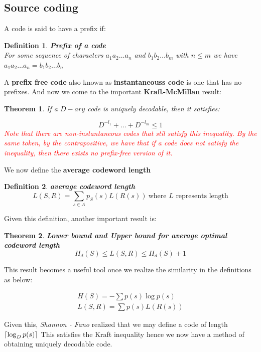 \documentclass[titlepage]{article}
\DeclarePairedDelimiter{\ceil}{\lceil}{\rceil}
\newtheorem{theorem}{Theorem}[section]
\newtheorem{definition}{Definition}
\begin{document}
\subsection{Source coding}
A code is said to have a prefix if:
\begin{definition}\textbf{Prefix of a code}
\\

For some sequence of characters $a_{1}a_{2}\ldots a_{n}$ and $b_{1}b_{2}\ldots b_{m}$ with $n \leq m$ we have $a_{1}a_{2}\ldots a_{n} =  b_{1}b_{2}\ldots b_{n}$
\end{definition}

A \textbf{prefix free code} also known as \textbf{instantaneouss code} is one that has no prefixes. And now we come to the important \textbf{Kraft-McMillan} result:

\begin{theorem}
If a $D-ary$ code is uniquely decodable, then it satisfies:

$$ D^{-l_{1}} + \ldots + D^{-l_{m}} \leq 1 $$
\textcolor{red}{Note that there are non-instantaneous codes that stil satisfy this inequality. By the same token, by the contrapositive, we have that if a code does not satisfy the inequality, then there exists no prefix-free version of it.}
\end{theorem}

We now define the \textbf{average codeword length}

\begin{definition}\textbf{average codeword length}
$$ L(S,R) = \sum_{s \in A} p_{S}(s)L(R(s)) \ \text{where $L$ represents length}$$
\end{definition}

Given this definition, another important result is:

\begin{theorem} \textbf{Lower bound and Upper bound for average optimal codeword length}
$$H_{d}(S) \leq L(S,R) \leq H_{d}(S) + 1$$
\end{theorem}

This result becomes a useful tool once we realize the similarity in the definitions as below:

\begin{align*}
    H(S) = - \sum p(s)\log p(s)\\
    L(S,R) = \sum p(s)L(R(s))
\end{align*}

Given this, \textit{Shannon - Fano} realized that we may define a code of length $\ceil*{\log_{D} p(s)}$
This satisfies the Kraft inequality hence we now have a method of obtaining uniquely decodable code. 
\\
\end{document}
